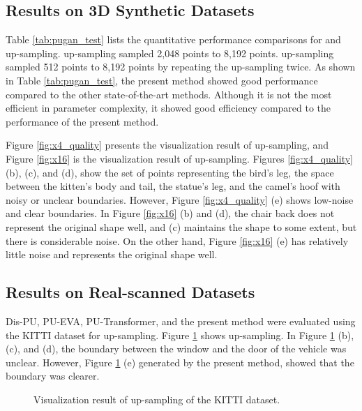 \documentclass{article}
\begin{document}
\subsection{Results on 3D Synthetic Datasets}
\quad Table \ref{tab:pugan_test} lists the quantitative performance comparisons for  and  up-sampling.  up-sampling sampled 2,048 points to 8,192 points.  up-sampling sampled 512 points to 8,192 points by repeating the  up-sampling twice. As shown in Table \ref{tab:pugan_test}, the present method showed good performance compared to the other state-of-the-art methods. Although it is not the most efficient in parameter complexity, it showed good efficiency compared to the performance of the present method. 

\quad Figure \ref{fig:x4_quality} presents the visualization result of  up-sampling, and Figure \ref{fig:x16}  is the visualization result of  up-sampling. Figures \ref{fig:x4_quality} (b), (c), and (d), show the set of points representing the bird's leg, the space between the kitten's body and tail, the statue's leg, and the camel's hoof with noisy or unclear boundaries. However, Figure \ref{fig:x4_quality} (e) shows low-noise and clear boundaries. In Figure \ref{fig:x16} (b) and (d), the chair back does not represent the original shape well, and (c) maintains the shape to some extent, but there is considerable noise. On the other hand, Figure \ref{fig:x16} (e) has relatively little noise and represents the original shape well.

\subsection{Results on Real-scanned Datasets}
\quad Dis-PU, PU-EVA, PU-Transformer, and the present method were evaluated using the KITTI dataset for  up-sampling. Figure \ref{fig:kitti} shows  up-sampling. In Figure \ref{fig:kitti} (b), (c), and (d), the boundary between the window and the door of the vehicle was unclear. However, Figure \ref{fig:kitti} (e) generated by the present method, showed that the boundary was clearer.


\begin{figure}[htb!]
  \centering
  
  \caption{Visualization result of  up-sampling of the KITTI dataset.}
    \label{fig:kitti}
\end{figure}
\end{document}
